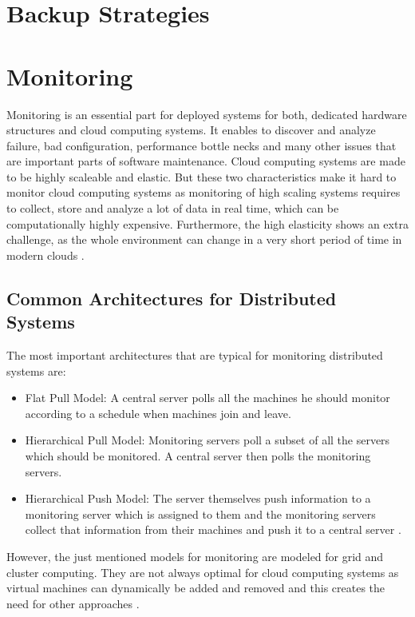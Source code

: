 \section{Backup Strategies}

\section{Monitoring}
Monitoring is an essential part for deployed systems for both,  dedicated hardware structures and cloud computing systems. It enables to discover and analyze failure, bad configuration, performance bottle necks and many other issues that are important parts of software maintenance. Cloud computing systems are made to be highly scaleable and elastic. But these two characteristics make it hard to monitor cloud computing systems as monitoring of high scaling systems requires to collect, store and analyze a lot of data in real time, which can be computationally highly expensive. Furthermore, the high elasticity shows an extra challenge, as the whole environment can change in a very short period of time in modern clouds \cite{Ward_2014}.

\subsection{Common Architectures for Distributed Systems}
\label{sec:common_arc_ds}
The most important architectures that are typical for monitoring distributed systems are:

\begin{itemize}
	\item Flat Pull Model: A central server polls all the machines he should monitor according to a schedule when machines join and leave.
	\item Hierarchical Pull Model: Monitoring servers poll a subset of all the servers which should be monitored. A central server then polls the monitoring servers.
	\item Hierarchical Push Model: The server themselves push information to a monitoring server which is assigned to them and the monitoring servers collect that information from their machines and push it to a central server \cite{Ward_2014}.
\end{itemize}

However, the just mentioned models for monitoring are modeled for grid and cluster computing. They are not always optimal for cloud computing systems as virtual machines can dynamically be added and removed and this creates the need for other approaches \cite{Ward_2014, He_2010}. 

